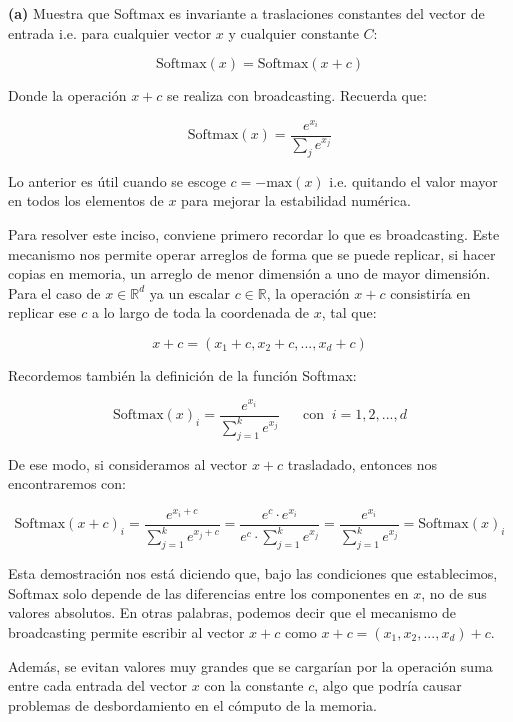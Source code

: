 \begin{myblock}
    
    \textbf{(a)} Muestra que Softmax es invariante a traslaciones constantes del vector de entrada
    i.e. para cualquier vector $x$ y cualquier constante $C$:

    \[
        \text{Softmax}(x) = \text{Softmax}(x + c)
    \]

    Donde la operación $x+c$ se realiza con broadcasting. Recuerda que:

    \[
        \text{Softmax}(x) = \frac{e^{x_i}}{\sum_{j} e^{x_j}}
    \]

    Lo anterior es útil cuando se escoge $c = -\text{max}(x)$ i.e. quitando el valor mayor
    en todos los elementos de $x$ para mejorar la estabilidad numérica. 
\end{myblock}

Para resolver este inciso, conviene primero recordar lo que es broadcasting. Este mecanismo
nos permite operar arreglos de forma que se puede replicar, si hacer copias en memoria, un 
arreglo de menor dimensión a uno de mayor dimensión. Para el caso de $x \in \mathbb{R}^d$ ya
un escalar $c \in \mathbb{R}$, la operación $x+c$ consistiría en replicar ese $c$ a lo largo 
de toda la coordenada de $x$, tal que:

\[
    x+c = (x_1 + c, x_2 + c,..., x_d + c)
\]  

Recordemos también la definición de la función Softmax:

\[
    \text{Softmax}(x)_i = \frac{e^{x_i}}{\sum_{j=1}^{k} e^{x_j}} \;\;\;\;\;\; \text{con} \;\; i = 1,2,...,d 
\]

De ese modo, si consideramos al vector $x+c$ trasladado, entonces nos encontraremos con:

\[
    \boxed{\text{Softmax}(x+c)_i = \frac{e^{x_i + c}}{\sum_{j=1}^{k} e^{x_j + c}} = \frac{e^c \cdot e^{x_i}}{e^c \cdot \sum_{j=1}^{k} e^{x_j}} = \frac{e^{x_i}}{\sum_{j=1}^{k} e^{x_j}}  = \text{Softmax}(x)_i}
\]

Esta demostración nos está diciendo que, bajo las condiciones que establecimos, Softmax
solo depende de las diferencias entre los componentes en $x$, no de sus valores absolutos.
En otras palabras, podemos decir que el mecanismo de broadcasting permite escribir al vector
$x+c$ como $x+c = (x_1, x_2,...,x_d)+c$. 

Además, se evitan valores muy grandes que se cargarían por la operación suma entre cada entrada 
del vector $x$ con la constante $c$, algo que podría causar problemas de desbordamiento en el 
cómputo de la memoria. 

